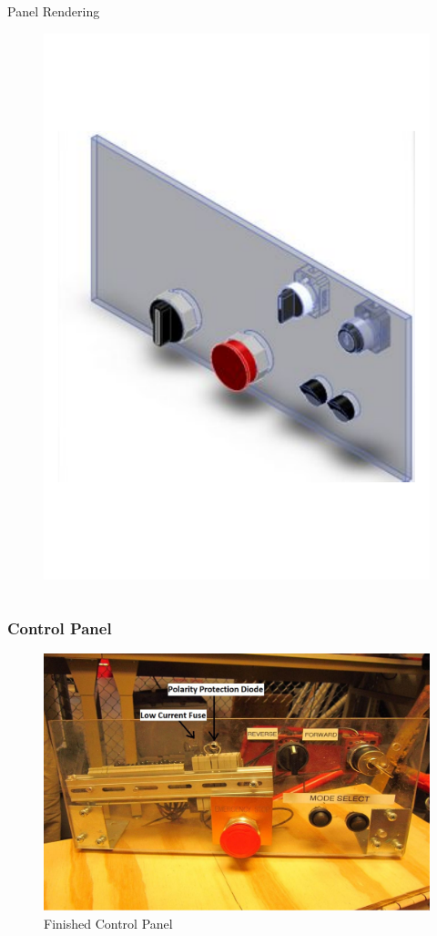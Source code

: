 \documentclass{beamer}
\begin{document}
\begin{frame}
\begin{columns}[T]
\begin{column}{0.5\textwidth}
\begin{block}{Panel Rendering}
\begin{figure}
					\includegraphics[scale=.2]{figures/panel1.pdf}
				\end{figure}
			\end{block}	
		\end{column}
	\end{columns}							
\end{frame}
\begin{frame}
	\frametitle{Control Panel}
	\begin{figure}
		\centering 
		\includegraphics[scale=.32]{figures/panel-update.pdf}
		\caption{Finished Control Panel}
	\end{figure}	
\end{frame}
\end{document}
